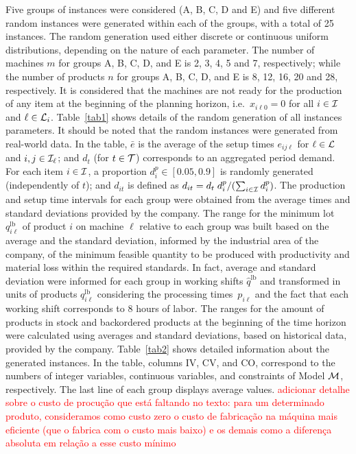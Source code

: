 \documentclass[11pt]{article}
\begin{document}
Five groups of instances were considered (A, B, C, D and E) and five different random instances were generated within each of the groups, with a total of 25 instances.  The random generation used either discrete or continuous uniform distributions, depending on the nature of each parameter. The number of machines $m$ for groups A, B, C, D, and E is 2, 3, 4, 5 and 7, respectively; while the number of products $n$ for groups A, B, C, D, and E is 8, 12, 16, 20 and 28, respectively. It is considered that the machines are not ready for the production of any item at the beginning of the planning horizon, i.e.\ $x_{i \ell 0}=0$ for all $i \in {\cal I}$ and $\ell \in {\cal L}_i$. Table~\ref{tab1} shows details of the random generation of all instances parameters. It should be noted that the random instances were generated from real-world data. In the table, $\bar e$ is the average of the setup times $e_{ij\ell}$ for $\ell \in {\cal L}$ and $i,j \in {\cal I}_\ell$; and $d_t$ (for $t \in {\cal T}$) corresponds to an aggregated period demand. For each item $i \in {\cal I}$, a proportion $d_{i}^p \in [0.05, 0.9]$ is randomly generated (independently of $t$); and $d_{it}$ is defined as $d_{it} = d_t \; d_i^p / ( \sum_{i \in {\cal I}} d_i^p )$. The production and setup time intervals for each group were obtained from the average times and standard deviations provided by the company. The range for the minimum lot $q_{i\ell}^{\mathrm{lb}}$ of product $i$ on machine $\ell$ relative to each group was built based on the average and the standard deviation, informed by the industrial area of the company, of the minimum feasible quantity to be produced with productivity and material loss within the required standards. In fact, average and standard deviation were informed for each group in working shifts $\hat q^{\mathrm{lb}}$ and transformed in units of products $q_{i\ell}^{\mathrm{lb}}$ considering the processing times~$p_{i\ell}$ and the fact that each working shift corresponds to 8 hours of labor. The ranges for the amount of products in stock and backordered products at the beginning of the time horizon were calculated using averages and standard deviations, based on historical data, provided by the company. Table~\ref{tab2} shows detailed information about the generated instances. In the table, columns IV, CV, and CO, correspond to the numbers of integer variables, continuous variables, and constraints of Model ${\cal M}$, respectively. The last line of each group displays average values. \textcolor{red}{adicionar detalhe sobre o custo de procução que está faltando no texto: para um determinado produto,
consideramos como custo zero o custo de fabricação na máquina mais eficiente
(que o fabrica com o custo mais baixo) e os demais como a diferença absoluta em
relação a esse custo mínimo}
\end{document}
